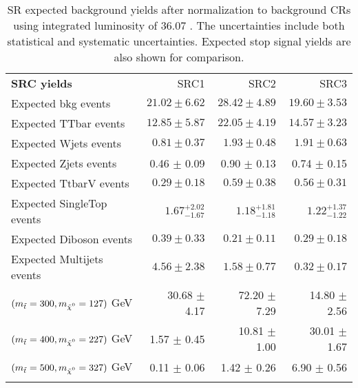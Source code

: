 

\begin{table}[!h]
\caption{SR expected background yields after normalization to background CRs using integrated luminosity of 36.07 \ifb. The uncertainties include both statistical and systematic uncertainties.  Expected stop signal yields are also shown for comparison.}
\label{table.SRYields}
\begin{center}
\setlength{\tabcolsep}{0.0pc}
{\small
\begin{tabular*}{\textwidth}{@{\extracolsep{\fill}}lrrr}
\noalign{\smallskip}\hline\noalign{\smallskip}
{\bf SRC yields}           & SRC1            & SRC2            & SRC3              \\[-0.05cm]
\noalign{\smallskip}\hline\noalign{\smallskip}
Expected bkg events         & $21.02 \pm 6.62$          & $28.42 \pm 4.89$          & $19.60 \pm 3.53$              \\
\noalign{\smallskip}\hline\noalign{\smallskip}
        Expected TTbar events         & $12.85 \pm 5.87$          & $22.05 \pm 4.19$          & $14.57 \pm 3.23$              \\
        Expected Wjets events         & $0.81 \pm 0.37$          & $1.93 \pm 0.48$          & $1.91 \pm 0.63$              \\
        Expected Zjets events         & 0.46 $\pm$ 0.09          & 0.90 $\pm$ 0.13          &  0.74 $\pm$ 0.15               \\
        Expected TtbarV events         & $0.29 \pm 0.18$          & $0.59 \pm 0.38$          & $0.56 \pm 0.31$              \\
        Expected SingleTop events         & $1.67_{-1.67}^{+2.02}$          & $1.18_{-1.18}^{+1.81}$          & $1.22_{-1.22}^{+1.37}$              \\
        Expected Diboson events         & $0.39 \pm 0.33$          & $0.21 \pm 0.11$          & $0.29 \pm 0.18$              \\
        Expected Multijets events         & $4.56 \pm 2.38$          & $1.58 \pm 0.77$          & $0.32 \pm 0.17$              \\
 \noalign{\smallskip}\hline\noalign{\smallskip}
$(\mstop = 300, \mLSP = 127)$ GeV & 30.68 $\pm$ 4.17 & 72.20 $\pm$ 7.29 & 14.80 $\pm$ 2.56 \\
$(\mstop = 400, \mLSP = 227)$ GeV & 1.57 $\pm$ 0.45  & 10.81 $\pm$ 1.00 & 30.01 $\pm$ 1.67 \\
$(\mstop = 500, \mLSP = 327)$ GeV & 0.11 $\pm$ 0.06  & 1.42 $\pm$ 0.26  & 6.90 $\pm$ 0.56 \\
 \noalign{\smallskip}\hline\noalign{\smallskip}


\end{tabular*}}
\end{center}
\end{table}
